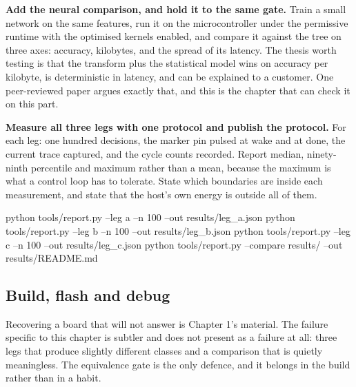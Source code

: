 \begin{steps}
\item \textbf{Add the neural comparison, and hold it to the same gate.} Train a
small network on the same features, run it on the microcontroller under the
permissive runtime with the optimised kernels enabled, and compare it against
the tree on three axes: accuracy, kilobytes, and the spread of its latency. The
thesis worth testing is that the transform plus the statistical model wins on
accuracy per kilobyte, is deterministic in latency, and can be explained to a
customer. One peer-reviewed paper argues exactly that, and this is the chapter
that can check it on this part.

\item \textbf{Measure all three legs with one protocol and publish the
protocol.} For each leg: one hundred decisions, the marker pin pulsed at wake
and at done, the current trace captured, and the cycle counts recorded. Report
median, ninety-ninth percentile and maximum rather than a mean, because the
maximum is what a control loop has to tolerate. State which boundaries are
inside each measurement, and state that the host's own energy is outside all of
them.
\begin{shellcode}
python tools/report.py --leg a --n 100 --out results/leg_a.json
python tools/report.py --leg b --n 100 --out results/leg_b.json
python tools/report.py --leg c --n 100 --out results/leg_c.json
python tools/report.py --compare results/ --out results/README.md
\end{shellcode}
\end{steps}

\subsection*{Build, flash and debug}



Recovering a board that will not answer is Chapter 1's material. The failure
specific to this chapter is subtler and does not present as a failure at all:
three legs that produce slightly different classes and a comparison that is
quietly meaningless. The equivalence gate is the only defence, and it belongs in
the build rather than in a habit.

